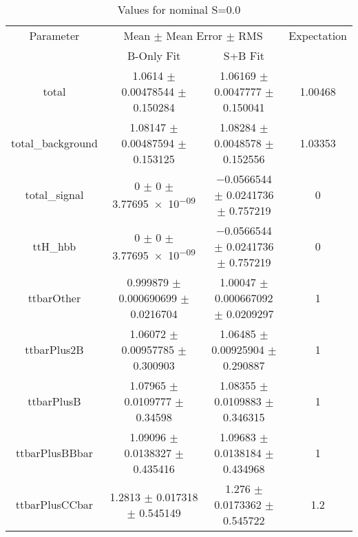 \begin{table}
\centering
\caption{Values for nominal S=0.0}
\begin{tabular}{cccc}
\toprule
Parameter & \multicolumn{2}{c}{Mean $\pm$ Mean Error $\pm$ RMS} & Expectation\\
 & B-Only Fit & S+B Fit & \\
\midrule
total & \num{1.0614} $\pm$ \num{0.00478544} $\pm$ \num{0.150284} & \num{1.06169} $\pm$ \num{0.0047777} $\pm$ \num{0.150041} & \num{1.00468}\\
total\_background & \num{1.08147} $\pm$ \num{0.00487594} $\pm$ \num{0.153125} & \num{1.08284} $\pm$ \num{0.0048578} $\pm$ \num{0.152556} & \num{1.03353}\\
total\_signal & \num{0} $\pm$ \num{0} $\pm$ \num{3.77695e-09} & \num{-0.0566544} $\pm$ \num{0.0241736} $\pm$ \num{0.757219} & \num{0}\\
ttH\_hbb & \num{0} $\pm$ \num{0} $\pm$ \num{3.77695e-09} & \num{-0.0566544} $\pm$ \num{0.0241736} $\pm$ \num{0.757219} & \num{0}\\
ttbarOther & \num{0.999879} $\pm$ \num{0.000690699} $\pm$ \num{0.0216704} & \num{1.00047} $\pm$ \num{0.000667092} $\pm$ \num{0.0209297} & \num{1}\\
ttbarPlus2B & \num{1.06072} $\pm$ \num{0.00957785} $\pm$ \num{0.300903} & \num{1.06485} $\pm$ \num{0.00925904} $\pm$ \num{0.290887} & \num{1}\\
ttbarPlusB & \num{1.07965} $\pm$ \num{0.0109777} $\pm$ \num{0.34598} & \num{1.08355} $\pm$ \num{0.0109883} $\pm$ \num{0.346315} & \num{1}\\
ttbarPlusBBbar & \num{1.09096} $\pm$ \num{0.0138327} $\pm$ \num{0.435416} & \num{1.09683} $\pm$ \num{0.0138184} $\pm$ \num{0.434968} & \num{1}\\
ttbarPlusCCbar & \num{1.2813} $\pm$ \num{0.017318} $\pm$ \num{0.545149} & \num{1.276} $\pm$ \num{0.0173362} $\pm$ \num{0.545722} & \num{1.2}\\
\bottomrule
\end{tabular}
\end{table}